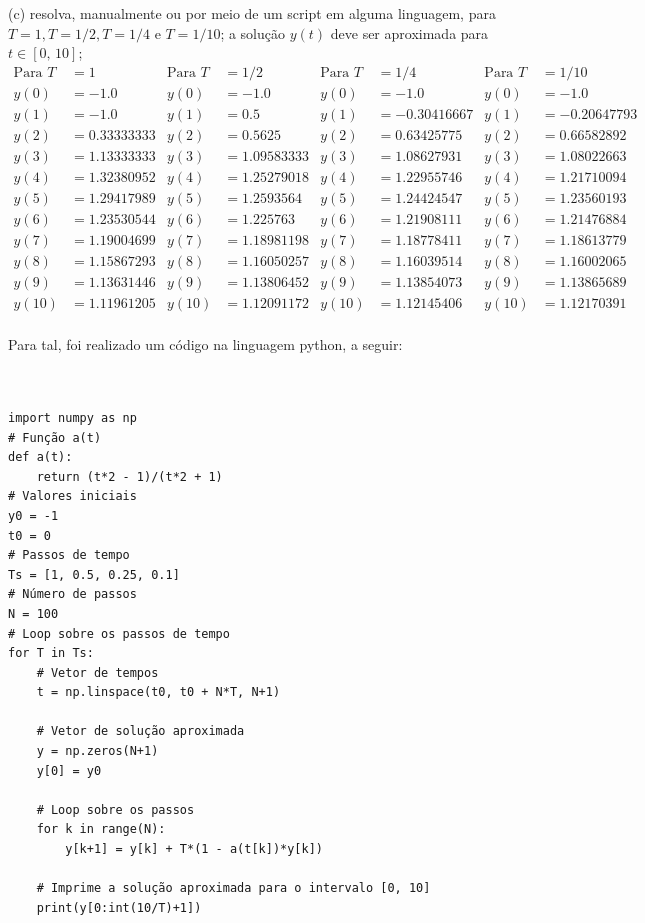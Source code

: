 \documentclass[10pt]{article}
\begin{document}
(c) resolva, manualmente ou por meio de um script em alguma linguagem, para $T = 1, T = 1/2, T = 1/4$ e $T = 1/10$; a solução $y(t)$ deve ser aproximada para $t \in [0, \, 10]$;
\begin{align*}
    \text{Para } T &= 1  & \text{Para } T &= 1/2   &  \text{Para } T &= 1/4       & \text{Para } T &= 1/10\\
    y(0) &= -1.0        & y(0)  &= -1.0        &  y(0) &= -1.0             &  y(0) &= -1.0\\
    y(1) &= -1.0        & y(1)  &= 0.5         &  y(1) &= -0.30416667      &  y(1) &= -0.20647793\\
    y(2) &= 0.33333333  & y(2)  &= 0.5625      &  y(2) &= 0.63425775       &  y(2) &= 0.66582892\\
    y(3) &= 1.13333333  & y(3)  &= 1.09583333  &  y(3) &= 1.08627931       &  y(3) &= 1.08022663\\
    y(4) &= 1.32380952  & y(4)  &= 1.25279018  &  y(4) &= 1.22955746       &  y(4) &= 1.21710094\\
    y(5) &= 1.29417989  & y(5)  &= 1.2593564   &  y(5) &= 1.24424547       &  y(5) &= 1.23560193\\
    y(6) &= 1.23530544  & y(6)  &= 1.225763    &  y(6) &= 1.21908111       &  y(6) &= 1.21476884\\
    y(7) &= 1.19004699  & y(7)  &= 1.18981198  &  y(7) &= 1.18778411       &  y(7) &= 1.18613779\\
    y(8) &= 1.15867293  & y(8)  &= 1.16050257  &  y(8) &= 1.16039514       &  y(8) &= 1.16002065\\
    y(9) &= 1.13631446  & y(9)  &= 1.13806452  &  y(9) &= 1.13854073       &  y(9) &= 1.13865689\\
    y(10) &= 1.11961205 & y(10) &= 1.12091172  &  y(10) &= 1.12145406      &  y(10) &= 1.12170391\\
\end{align*}

Para tal, foi realizado um código na linguagem python, a seguir:

\begin{verbatim}


import numpy as np
# Função a(t)
def a(t):
    return (t*2 - 1)/(t*2 + 1)
# Valores iniciais
y0 = -1
t0 = 0
# Passos de tempo
Ts = [1, 0.5, 0.25, 0.1]
# Número de passos
N = 100
# Loop sobre os passos de tempo
for T in Ts:
    # Vetor de tempos
    t = np.linspace(t0, t0 + N*T, N+1)
    
    # Vetor de solução aproximada
    y = np.zeros(N+1)
    y[0] = y0
    
    # Loop sobre os passos
    for k in range(N):
        y[k+1] = y[k] + T*(1 - a(t[k])*y[k])
    
    # Imprime a solução aproximada para o intervalo [0, 10]
    print(y[0:int(10/T)+1])
\end{verbatim}
\end{document}
